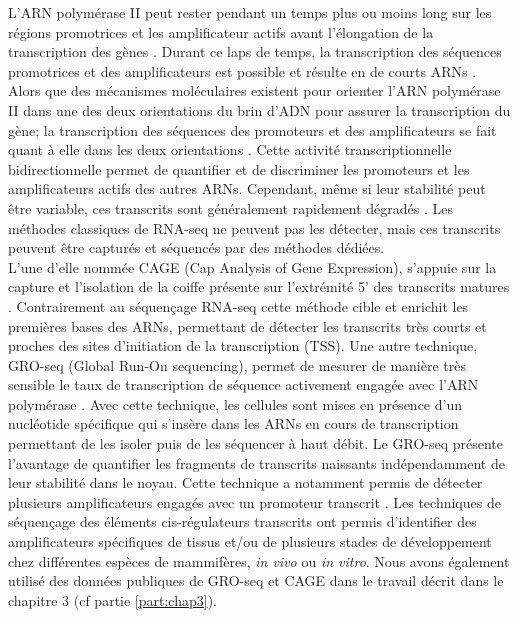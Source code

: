 L’ARN polymérase II peut rester pendant un temps plus ou moins long sur les régions promotrices et les \gls{amplificateur} actifs avant l’élongation de la transcription des gènes \citep{rougvie_rna_1988, mayer_pause_2017}. Durant ce laps de temps, la transcription des séquences promotrices et des \glspl{amplificateur} est possible et résulte en de courts \acrshort{ARN}s \citep{kim_widespread_2010}. Alors que des mécanismes moléculaires existent pour orienter l’ARN polymérase II dans une des deux orientations du brin d'\acrshort{ADN} pour assurer la transcription du gène; la transcription des séquences des promoteurs et des \glspl{amplificateur} se fait quant à elle dans les deux orientations \citep{kim_widespread_2010, andersson_atlas_2014}. Cette activité transcriptionnelle bidirectionnelle permet de quantifier et de discriminer les promoteurs et les \glspl{amplificateur} actifs des autres \acrshort{ARN}s. Cependant, même si leur stabilité peut être variable, ces transcrits sont généralement rapidement dégradés \citep{almada_promoter_2013}. Les méthodes classiques de \acrshort{RNA-seq} ne peuvent pas les détecter, mais ces transcrits peuvent être capturés et séquencés par des méthodes dédiées. \\

L’une d’elle nommée \acrshort{CAGE} (Cap Analysis of Gene Expression), s’appuie sur la capture et l’isolation de la coiffe présente sur l’extrémité 5’ des transcrits matures \citep{shiraki_cap_2003, andersson_atlas_2014}. Contrairement au séquençage \acrshort{RNA-seq} cette méthode cible et enrichit les premières bases des \acrshort{ARN}s, permettant de détecter les transcrits très courts et proches des sites d’initiation de la transcription (\acrshort{TSS}). Une autre technique, GRO-seq (Global Run-On sequencing), permet de mesurer de manière très sensible le taux de transcription de séquence activement engagée avec l’ARN polymérase \citep{core_nascent_2008}. Avec cette technique, les cellules sont mises en présence d’un nucléotide spécifique qui s'insère dans les \acrshort{ARN}s en cours de transcription permettant de les isoler puis de les séquencer à haut débit. Le GRO-seq présente l’avantage de quantifier les fragments de transcrits naissants indépendamment de leur stabilité dans le noyau. Cette technique a notamment permis de détecter plusieurs \glspl{amplificateur} engagés avec un promoteur transcrit \citep{melgar_discovery_2011}. Les techniques de séquençage des éléments \gls{cis}-régulateurs transcrits ont permis d’identifier des \glspl{amplificateur} spécifiques de tissus et/ou de plusieurs stades de développement chez différentes espèces de mammifères, \textit{in vivo} ou \textit{in vitro}. Nous avons également utilisé des données publiques de GRO-seq et \acrshort{CAGE} dans le travail décrit dans le chapitre 3 (cf partie \ref{part:chap3}).

